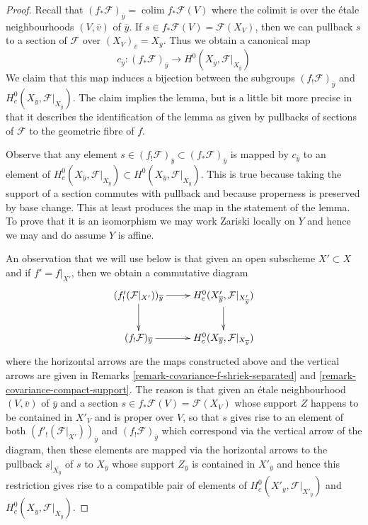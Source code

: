\documentclass{stacks-project}
\theoremstyle{plain}
\theoremstyle{definition}
\theoremstyle{remark}
\numberwithin{equation}{subsection}
\def\colim{\mathop{\mathrm{colim}}\nolimits}
\begin{document}
\begin{proof}
Recall that $(f_*\mathcal{F})_{\overline{y}} = \colim f_*\mathcal{F}(V)$
where the colimit is over the \'etale neighbourhoods $(V, \overline{v})$
of $\overline{y}$. If $s \in f_*\mathcal{F}(V) = \mathcal{F}(X_V)$,
then we can pullback $s$ to a section of $\mathcal{F}$ over
$(X_V)_{\overline{v}} = X_{\overline{y}}$. Thus we obtain a canonical map
$$
c_{\overline{y}} :
(f_*\mathcal{F})_{\overline{y}}
\longrightarrow 
H^0(X_{\overline{y}}, \mathcal{F}|_{X_{\overline{y}}})
$$
We claim that this map induces a bijection between the subgroups
$(f_!\mathcal{F})_{\overline{y}}$ and
$H^0_c(X_{\overline{y}}, \mathcal{F}|_{X_{\overline{y}}})$.
The claim implies the lemma, but is a little bit more precise
in that it describes the identification of the lemma as given
by pullbacks of sections of $\mathcal{F}$ to the geometric fibre of $f$.

\medskip\noindent
Observe that any element
$s \in (f_!\mathcal{F})_{\overline{y}} \subset (f_*\mathcal{F})_{\overline{y}}$
is mapped by $c_{\overline{y}}$ to an element of
$H^0_c(X_{\overline{y}}, \mathcal{F}|_{X_{\overline{y}}}) \subset
H^0(X_{\overline{y}}, \mathcal{F}|_{X_{\overline{y}}})$.
This is true because taking the support of a section
commutes with pullback and because properness is preserved by
base change. This at least produces the map in the statement of the lemma.
To prove that it is an isomorphism we may work Zariski
locally on $Y$ and hence we may and do assume $Y$ is affine.

\medskip\noindent
An observation that we will use below
is that given an open subscheme $X' \subset X$
and if $f' = f|_{X'}$, then we obtain a commutative diagram
$$
\xymatrix{
(f'_!(\mathcal{F}|_{X'}))_{\overline{y}} \ar[r] \ar[d] &
H^0_c(X'_{\overline{y}}, \mathcal{F}|_{X'_{\overline{y}}}) \ar[d] \\
(f_!\mathcal{F})_{\overline{y}} \ar[r] &
H^0_c(X_{\overline{y}}, \mathcal{F}|_{X_{\overline{y}}})
}
$$
where the horizontal arrows are the maps constructed above and
the vertical arrows are given in
Remarks \ref{remark-covariance-f-shriek-separated} and
\ref{remark-covariance-compact-support}.
The reason is that given an \'etale neighbourhood $(V, \overline{v})$
of $\overline{y}$ and a section $s \in f_*\mathcal{F}(V) = \mathcal{F}(X_V)$
whose support $Z$ happens to be contained in $X'_V$ and is proper over $V$,
so that $s$ gives rise to an element of both
$(f'_!(\mathcal{F}|_{X'}))_{\overline{y}}$ and
$(f_!\mathcal{F})_{\overline{y}}$ which correspond via
the vertical arrow of the diagram, then these elements are mapped via the
horizontal arrows to the pullback $s|_{X_{\overline{y}}}$ of $s$ to
$X_{\overline{y}}$ whose support $Z_{\overline{y}}$ is contained in
$X'_{\overline{y}}$ and hence this restriction gives rise to
a compatible pair of elements of
$H^0_c(X'_{\overline{y}}, \mathcal{F}|_{X'_{\overline{y}}})$
and
$H^0_c(X_{\overline{y}}, \mathcal{F}|_{X_{\overline{y}}})$.


\end{proof}
\end{document}
